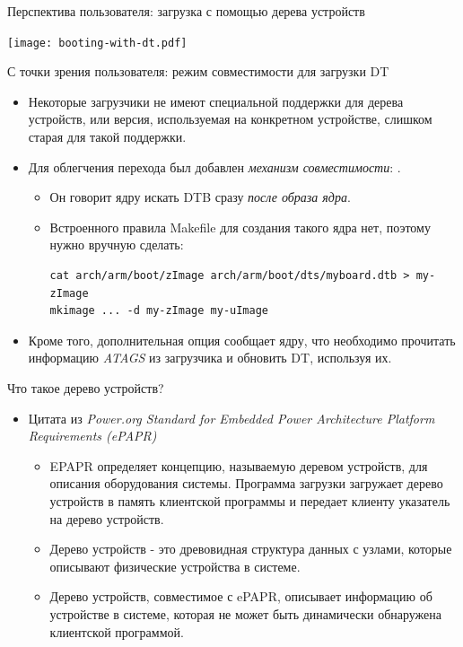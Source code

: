\documentclass[obeyspaces,spaces,hyphens]{beamer}
\begin{document}
\begin{frame}{Перспектива пользователя: загрузка с помощью дерева устройств}
  \begin{center}
    \texttt{[image: booting-with-dt.pdf]}
  \end{center}
\end{frame}

\begin{frame}[fragile]{С точки зрения пользователя: режим совместимости для загрузки DT
}
  \begin{itemize}
  \item Некоторые загрузчики не имеют специальной поддержки для дерева устройств, или версия, используемая на конкретном устройстве, слишком старая для такой поддержки.
  \item Для облегчения перехода был добавлен {\em механизм совместимости}: .
    \begin{itemize}
    \item Он говорит ядру искать DTB сразу {\em после образа ядра}.
    \item Встроенного правила Makefile для создания такого ядра нет, поэтому нужно вручную сделать:
      \begin{block}{}
        \begin{verbatim}
cat arch/arm/boot/zImage arch/arm/boot/dts/myboard.dtb > my-zImage
mkimage ... -d my-zImage my-uImage
\end{verbatim}
\end{block}
\end{itemize}
  \item Кроме того, дополнительная опция
     сообщает ядру, что необходимо прочитать информацию {\em ATAGS} из загрузчика и обновить DT, используя их.
  \end{itemize}
\end{frame}

\begin{frame}{Что такое дерево устройств?}
  \begin{itemize}
  \item Цитата из {\em Power.org Standard for Embedded Power
      Architecture Platform Requirements (ePAPR)}
    \begin{itemize}
    \item EPAPR определяет концепцию, называемую деревом устройств, для описания оборудования системы. Программа загрузки загружает дерево устройств в память клиентской программы и передает клиенту указатель на дерево устройств.
    \item Дерево устройств - это древовидная структура данных с узлами, которые описывают физические устройства в системе.
    \item Дерево устройств, совместимое с ePAPR, описывает информацию об устройстве в системе, которая не может быть динамически обнаружена клиентской программой.
    \end{itemize}
  \end{itemize}
\end{frame}
\end{document}
